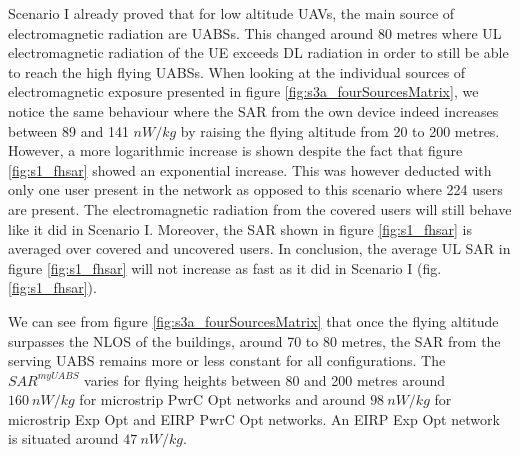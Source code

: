 Scenario I already proved that for low altitude \gls{UAV}s, the main source of electromagnetic radiation are \gls{UABS}s. 
This changed around 80 metres where \gls{UL} electromagnetic radiation of the \gls{UE}
exceeds \gls{DL} radiation in order to still be able to reach the high flying \gls{UABS}s. 
When looking at the individual sources of electromagnetic exposure presented in figure \ref{fig:s3a_fourSourcesMatrix}, 
we notice the same behaviour where the 
 \gls{SAR} from the own device indeed increases between 89 and 141 $nW/kg$ by raising the flying altitude from 
 20 to 200 metres.
  However, a more logarithmic increase is shown
  despite the fact that figure \ref{fig:s1_fhsar} showed an exponential increase.
This was however deducted with only one user present in the network as opposed to this scenario 
where 224 users are present. 
The electromagnetic radiation from the covered users will still behave like it did in Scenario I.
Moreover, the \gls{SAR} shown in figure  \ref{fig:s1_fhsar} is averaged  over covered and uncovered users.
In conclusion, the average  \gls{UL} \gls{SAR} in  figure \ref{fig:s1_fhsar} will not increase as fast as it did
in Scenario I (fig. \ref{fig:s1_fhsar}).

We can see from figure \ref{fig:s3a_fourSourcesMatrix} that once the flying altitude surpasses the \gls{NLOS} of the buildings, 
around 70 to 80 metres, the SAR from the serving \gls{UABS} remains 
more or less constant for all configurations.
The $SAR^{myUABS}$ varies for flying heights between 80 and 200 metres
around $160\ nW/kg$ for microstrip \gls{PwrC Opt} networks and around $98\ nW/kg$ for microstrip \gls{Exp Opt} and \gls{EIRP} \gls{PwrC Opt} networks.
An \gls{EIRP} \gls{Exp Opt} network is situated around $47\ nW/kg$.


